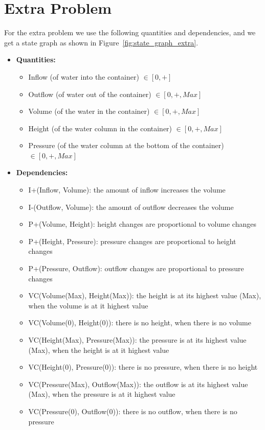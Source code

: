 \documentclass[a4paper]{article}
\begin{document}
\section{Extra Problem}
For the extra problem we use the following quantities and dependencies, and we get a state graph as shown in Figure~\ref{fig:state_graph_extra}.
\begin{itemize}
\item \textbf{Quantities:}
\begin{itemize}
\item Inflow (of water into the container) $\in [0, +]$
\item Outflow (of water out of the container) $\in [0, +, Max]$
\item Volume (of the water in the container) $\in [0, +, Max]$
\item Height (of the water column in the container) $\in [0, +, Max]$
\item Pressure (of the water column at the bottom of the container) $\in [0, +, Max]$
\end{itemize}

\item \textbf{Dependencies:}
\begin{itemize}
\item I+(Inflow, Volume): the amount of inflow increases the volume
\item I-(Outflow, Volume): the amount of outflow decreases the volume
\item P+(Volume, Height): height changes are proportional to volume changes
\item P+(Height, Pressure): pressure changes are proportional to height changes
\item P+(Pressure, Outflow): outflow changes are proportional to pressure changes
\item VC(Volume(Max), Height(Max)): the height is at its highest value (Max), when the volume is at it highest value
\item VC(Volume(0), Height(0)): there is no height, when there is no volume
\item VC(Height(Max), Pressure(Max)): the pressure is at its highest value (Max), when the height is at it highest value
\item VC(Height(0), Pressure(0)): there is no pressure, when there is no height
\item VC(Pressure(Max), Outflow(Max)): the outflow is at its highest value (Max), when the pressure is at it highest value
\item VC(Pressure(0), Outflow(0)): there is no outflow, when there is no pressure
\end{itemize}
\end{itemize}
\end{document}
